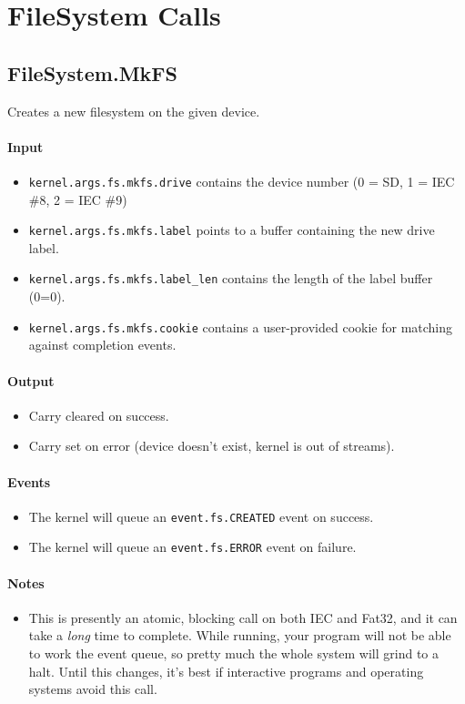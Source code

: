 \section*{FileSystem Calls}

\subsection*{FileSystem.MkFS}
Creates a new filesystem on the given device.

\paragraph{Input}
\begin{itemize}
\item \verb+kernel.args.fs.mkfs.drive+ contains the device number (0 = SD, 1 = IEC \#8, 2 = IEC \#9)
\item \verb+kernel.args.fs.mkfs.label+ points to a buffer containing the new drive label.
\item \verb+kernel.args.fs.mkfs.label_len+ contains the length of the label buffer (0=0).
\item \verb+kernel.args.fs.mkfs.cookie+ contains a user-provided cookie for matching against completion events.
\end{itemize}

\paragraph{Output}
\begin{itemize}
\item Carry cleared on success.
\item Carry set on error (device doesn't exist, kernel is out of streams).
\end{itemize}

\paragraph{Events}
\begin{itemize}
\item The kernel will queue an \verb+event.fs.CREATED+ event on success.
\item The kernel will queue an \verb+event.fs.ERROR+ event on failure.
\end{itemize}

\paragraph{Notes}
\begin{itemize}
\item This is presently an atomic, blocking call on both IEC and Fat32, and it can take a {\em long} time to complete.  While running, your program will not be able to work the event queue, so pretty much the whole system will grind to a halt.  Until this changes, it's best if interactive programs and operating systems avoid this call.  
\end{itemize}

